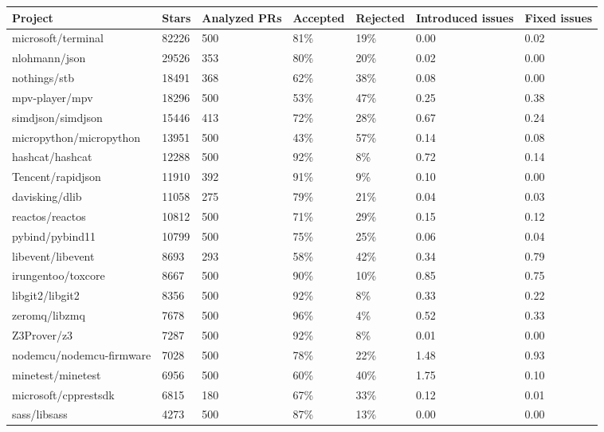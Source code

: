 \begin{tabular}{|p{4cm}p{0.8cm}p{1cm}p{1cm}p{1cm}p{1.2cm}p{0.8cm}|}
  \hline
Project & Stars & Analyzed PRs & Accepted & Rejected & Introduced issues & Fixed issues \\ 
  \hline \hline
microsoft/terminal & 82226 & 500 & 81\% & 19\% & 0.00 & 0.02 \\ 
  nlohmann/json & 29526 & 353 & 80\% & 20\% & 0.02 & 0.00 \\ 
  nothings/stb & 18491 & 368 & 62\% & 38\% & 0.08 & 0.00 \\ 
  mpv-player/mpv & 18296 & 500 & 53\% & 47\% & 0.25 & 0.38 \\ 
  simdjson/simdjson & 15446 & 413 & 72\% & 28\% & 0.67 & 0.24 \\ 
  micropython/micropython & 13951 & 500 & 43\% & 57\% & 0.14 & 0.08 \\ 
  hashcat/hashcat & 12288 & 500 & 92\% & 8\% & 0.72 & 0.14 \\ 
  Tencent/rapidjson & 11910 & 392 & 91\% & 9\% & 0.10 & 0.00 \\ 
  davisking/dlib & 11058 & 275 & 79\% & 21\% & 0.04 & 0.03 \\ 
  reactos/reactos & 10812 & 500 & 71\% & 29\% & 0.15 & 0.12 \\ 
  pybind/pybind11 & 10799 & 500 & 75\% & 25\% & 0.06 & 0.04 \\ 
  libevent/libevent & 8693 & 293 & 58\% & 42\% & 0.34 & 0.79 \\ 
  irungentoo/toxcore & 8667 & 500 & 90\% & 10\% & 0.85 & 0.75 \\ 
  libgit2/libgit2 & 8356 & 500 & 92\% & 8\% & 0.33 & 0.22 \\ 
  zeromq/libzmq & 7678 & 500 & 96\% & 4\% & 0.52 & 0.33 \\ 
  Z3Prover/z3 & 7287 & 500 & 92\% & 8\% & 0.01 & 0.00 \\ 
  nodemcu/nodemcu-firmware & 7028 & 500 & 78\% & 22\% & 1.48 & 0.93 \\ 
  minetest/minetest & 6956 & 500 & 60\% & 40\% & 1.75 & 0.10 \\ 
  microsoft/cpprestsdk & 6815 & 180 & 67\% & 33\% & 0.12 & 0.01 \\ 
  sass/libsass & 4273 & 500 & 87\% & 13\% & 0.00 & 0.00 \\ 
   \hline
\end{tabular}
